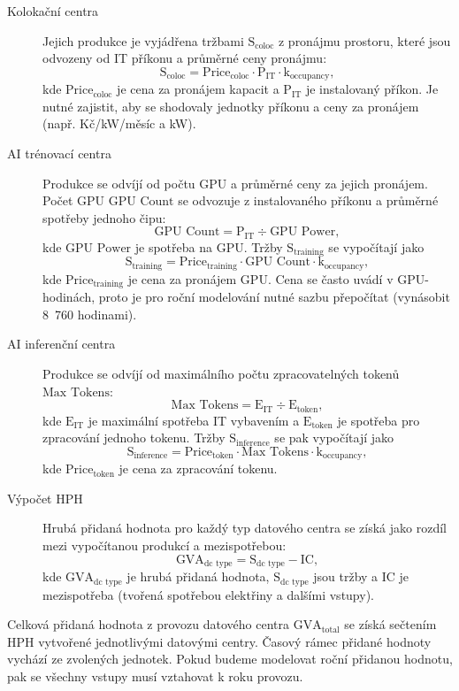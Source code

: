 \begin{description}
	\item[Kolokační centra]
	{
		Jejich produkce je vyjádřena tržbami $\text{S}_\text{coloc}$ z pronájmu prostoru, které jsou odvozeny od IT příkonu a průměrné ceny pronájmu:
		$$\text{S}_\text{coloc} = \text{Price}_\text{coloc} \cdot \text{P}_\text{IT} \cdot \text{k}_\text{occupancy},$$
		kde $\text{Price}_\text{coloc}$ je cena za pronájem kapacit a $\text{P}_\text{IT}$ je instalovaný příkon. Je nutné zajistit, aby se shodovaly jednotky příkonu a ceny za pronájem (např. Kč/kW/měsíc a kW).
	}

	\item[AI trénovací centra]
	{
		Produkce se odvíjí od počtu GPU a průměrné ceny za jejich pronájem. Počet GPU $\text{GPU Count}$ se odvozuje z instalovaného příkonu a průměrné spotřeby jednoho čipu:
		$$\text{GPU Count} = \text{P}_\text{IT} \div \text{GPU Power},$$
		kde $\text{GPU Power}$ je spotřeba na GPU. Tržby $\text{S}_\text{training}$ se vypočítají jako
		$$\text{S}_\text{training} = \text{Price}_\text{training} \cdot \text{GPU Count} \cdot \text{k}_\text{occupancy},$$
		kde $\text{Price}_\text{training}$ je cena za pronájem GPU. Cena se často uvádí v GPU-hodinách, proto je pro roční modelování nutné sazbu přepočítat (vynásobit 8~760 hodinami).
	}

	\item[AI inferenční centra]
	{
		Produkce se odvíjí od maximálního počtu zpracovatelných tokenů $\text{Max Tokens}$:
		$$\text{Max Tokens} = \text{E}_\text{IT} \div \text{E}_\text{token},$$
		kde $\text{E}_\text{IT}$ je maximální spotřeba IT vybavením a $\text{E}_\text{token}$ je spotřeba pro zpracování jednoho tokenu. Tržby $\text{S}_\text{inference}$ se pak vypočítají jako
		$$\text{S}_\text{inference} = \text{Price}_\text{token} \cdot \text{Max Tokens} \cdot \text{k}_\text{occupancy},$$
		kde $\text{Price}_\text{token}$ je cena za zpracování tokenu.
	}

	\item[Výpočet HPH]
	{
		Hrubá přidaná hodnota pro každý typ datového centra se získá jako rozdíl mezi vypočítanou produkcí a mezispotřebou:
		$$\text{GVA}_\text{dc type} = \text{S}_\text{dc type} - \text{IC},$$
		kde $\text{GVA}_\text{dc type}$ je hrubá přidaná hodnota, $\text{S}_\text{dc type}$ jsou tržby a $\text{IC}$ je mezispotřeba (tvořená spotřebou elektřiny a dalšími vstupy).
	}
\end{description}

Celková přidaná hodnota z provozu datového centra $\text{GVA}_\text{total}$ se získá sečtením HPH vytvořené jednotlivými datovými centry. Časový rámec přidané hodnoty vychází ze zvolených jednotek. Pokud budeme modelovat roční přidanou hodnotu, pak se všechny vstupy musí vztahovat k roku provozu.

